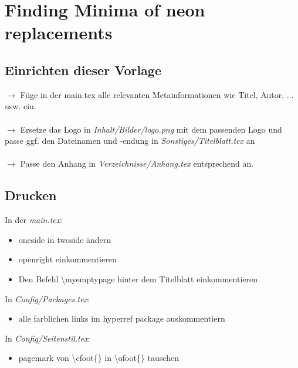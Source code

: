 \chapter{Finding Minima of neon replacements}
\label{chap:Erstes Kapitel}



%
%
\section{Einrichten dieser Vorlage}
\label{sec:Einrichten dieser Vorlage}
%
$\rightarrow$ Füge in der main.tex alle relevanten Metainformationen wie Titel, Autor, ... usw. ein.\\\\
%
$\rightarrow$ Ersetze das Logo in \textit{Inhalt/Bilder/logo.png} mit dem passenden Logo und passe ggf. den Dateinamen und -endung in \textit{Sonstiges/Titelblatt.tex} an\\\\
%
$\rightarrow$ Passe den Anhang in \textit{Verzeichnisse/Anhang.tex} entsprechend an.
%
%
\section{Drucken}
\label{sec:Drucken}
%
In der \textit{main.tex}:
\begin{itemize}
    \item oneside in twoside ändern
    \item openright einkommentieren
    \item  Den Befehl \textbackslash myemptypage hinter dem Titelblatt einkommentieren
\end{itemize}
%
In \textit{Config/Packages.tex}: 
\begin{itemize}
    \item alle farblichen links im hyperref package auskommentiern
\end{itemize}
%
In \textit{Config/Seitenstil.tex}: 
\begin{itemize}
    \item  pagemark von \textbackslash cfoot\{\} in \textbackslash ofoot\{\} tauschen
\end{itemize}
%
%
